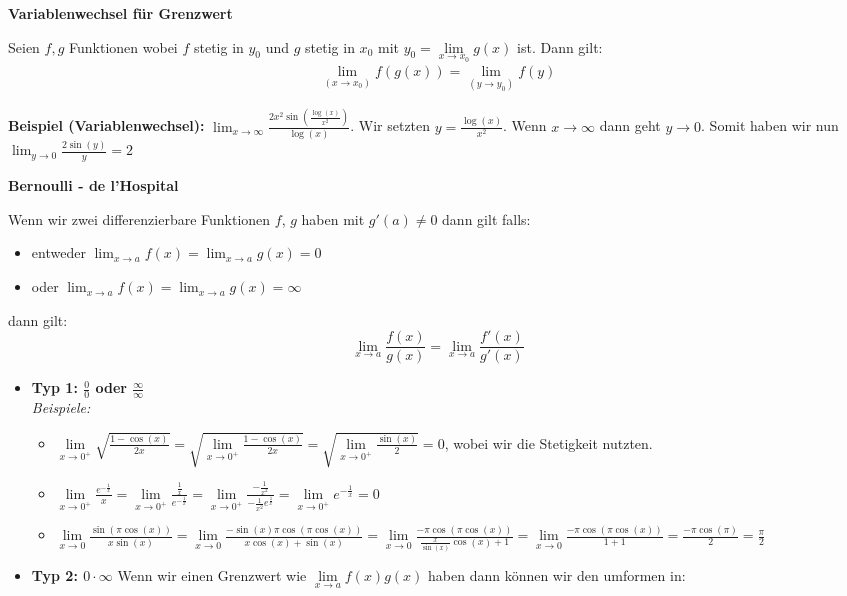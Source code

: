 \documentclass[25pt]{sciposter}
\newcommand{\limx}[1]{\lim\limits_{x \to #1}}
\newenvironment{method}[1]{\begin{mdframed}[backgroundcolor=blue!10,innertopmargin=15pt, innerbottommargin=15pt, nobreak=true]
		\textbf{#1 }
	}
	{ 
	\end{mdframed}
}
\begin{document}
\begin{multicols}{3}
\begin{method}{Variablenwechsel für Grenzwert}
	Seien $f,g$ Funktionen wobei $f$ stetig in $y_0$ und $g$ stetig in $x_0$ mit $y_0 = \lim\limits_{x \to x_0} g(x)$ ist. Dann gilt:
	\begin{align*}
		\lim_{(x\to x_0)}f(g(x)) = \lim_{(y\to y_0)} f(y)
	\end{align*}
\end{method}
\textbf{Beispiel (Variablenwechsel):} $\lim_{x\to \infty} \frac{2x^2 \sin\left(\frac{\log(x)}{x^2}\right)}{\log(x)}$. Wir setzten $y = \frac{\log(x)}{x^2}$. Wenn $x\to \infty$ dann geht $y \to 0$. Somit haben wir nun $\lim_{y \to 0} \frac{2\sin(y)}{y} = 2$

\begin{method}{Bernoulli - de l’Hospital}
	Wenn wir zwei differenzierbare Funktionen $f$, $g$ haben mit $g'(a)\not = 0$ dann gilt falls:
	\begin{itemize}
		\item entweder $\lim_{x \to a} f(x) = \lim_{x \to a} g(x) = 0 $
		\item oder $\lim_{x \to a} f(x) = \lim_{x \to a} g(x) = \infty $
	\end{itemize}
	dann gilt:
	\begin{equation*}
	\lim_{x \to a} \frac{f(x)}{g(x)} = 	\lim_{x \to a} \frac{f'(x)}{g'(x)}
	\end{equation*}
\end{method}
\begin{itemize}
	\item \textbf{Typ 1: $\frac{0}{0}$ oder $\frac{\infty}{\infty}$}\\
	\textit{Beispiele:}
	\begin{itemize}
		\item $\limx{0^+}\sqrt{\frac{1- \cos(x)}{2x}} = \sqrt{\limx{0^+}\frac{1- \cos(x)}{2x}} =  \sqrt{\limx{0^+}\frac{\sin(x)}{2}} = 0$, wobei wir die Stetigkeit nutzten.
		\item $\limx{0^+} \frac{e^{-\frac{1}{x}}}{x} = \limx{0^+} \frac{\frac{1}{x}}{e^{-\frac{1}{x}}} = \limx{0^+} \frac{-\frac{1}{x^2}}{-\frac{1}{x^2}e^{\frac{1}{x}}} = \limx{0^+} e^{- \frac{1}{x}} = 0$
		\item $\limx{0} \frac{\sin(\pi\cos(x))}{x\sin(x)} = \limx{0} \frac{-\sin(x)\pi\cos(\pi\cos(x))}{x\cos(x)+\sin(x)} = \limx{0} \frac{-\pi\cos(\pi\cos(x))}{\frac{x}{\sin(x)}\cos(x)+1} = \limx{0} \frac{-\pi\cos(\pi\cos(x))}{1+1} = \frac{-\pi\cos(\pi)}{2} = \frac{\pi}{2}$
	\end{itemize}
	\item \textbf{Typ 2: $0 \cdot \infty$} Wenn wir einen Grenzwert wie $\lim\limits_{x \to a} f(x)g(x)$ haben dann können wir den umformen in:

\end{itemize}
\end{multicols}
\end{document}
